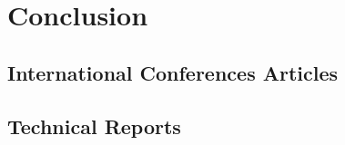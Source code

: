 \documentclass[11pt]{book}
\begin{document}



\chapter{Conclusion}
%


% 

\appendix





 \renewcommand{\bibname}{List of Publications}
 \begin{thebibliography}{9}


\section*{International Conferences Articles }




\section*{Technical Reports}




 \end{thebibliography}






\printindex
\end{document}
